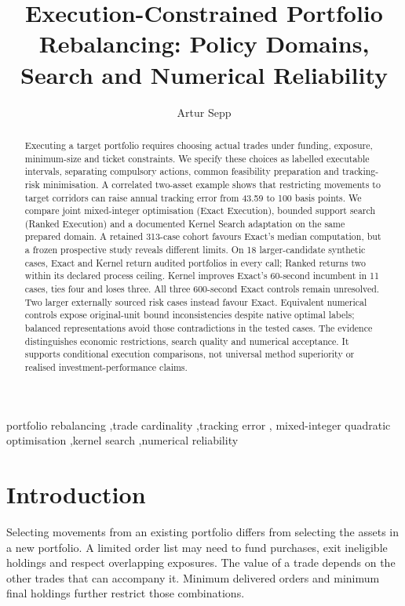 \documentclass[preprint,12pt,authoryear]{elsarticle}
\begin{document}
\begin{frontmatter}
\title{Execution-Constrained Portfolio Rebalancing: Policy Domains, Search and Numerical Reliability}
\author{Artur Sepp}
\address{LGT}
\begin{abstract}
Executing a target portfolio requires choosing actual trades under funding,
exposure, minimum-size and ticket constraints. We specify these choices as
labelled executable intervals, separating compulsory actions, common
feasibility preparation and tracking-risk minimisation. A correlated two-asset
example shows that restricting movements to target corridors can raise annual
tracking error from 43.59 to 100 basis points. We compare joint mixed-integer
optimisation (Exact Execution), bounded support search (Ranked Execution) and
a documented Kernel Search adaptation on the same prepared domain. A retained
313-case cohort favours Exact's median computation, but a frozen prospective
study reveals different limits. On 18 larger-candidate synthetic cases, Exact
and Kernel return audited portfolios in every call; Ranked returns two within
its declared process ceiling. Kernel improves Exact's 60-second incumbent in
11 cases, ties four and loses three. All three 600-second Exact controls remain
unresolved. Two larger externally sourced risk cases instead favour Exact.
Equivalent numerical controls expose original-unit bound inconsistencies despite
native optimal labels; balanced representations avoid those contradictions in
the tested cases. The evidence distinguishes economic restrictions, search
quality and numerical acceptance. It supports conditional execution comparisons,
not universal method superiority or realised investment-performance claims.
\end{abstract}
\begin{keyword}
portfolio rebalancing \sep trade cardinality \sep tracking error \sep
mixed-integer quadratic optimisation \sep kernel search \sep numerical reliability
\end{keyword}
\end{frontmatter}

\section{Introduction}
Selecting movements from an existing portfolio differs from selecting the
assets in a new portfolio. A limited order list may need to fund purchases,
exit ineligible holdings and respect overlapping exposures. The value of a
trade depends on the other trades that can accompany it. Minimum delivered
orders and minimum final holdings further restrict those combinations.
\end{document}
